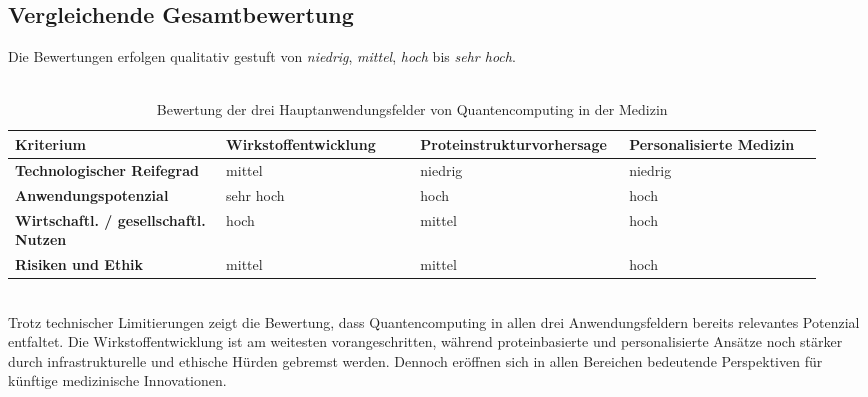 \subsection{Vergleichende Gesamtbewertung}
Die Bewertungen erfolgen qualitativ gestuft von \textit{niedrig}, \textit{mittel}, \textit{hoch} bis \textit{sehr hoch}.\\
\\
\begin{table}[h]
\centering
\begin{tabular}{|p{0.25\linewidth}|p{0.23\linewidth}|p{0.23\linewidth}|p{0.23\linewidth}|}
\hline
\textbf{Kriterium} & \textbf{Wirkstoff\-entwicklung} & \textbf{Proteinstruktur\-vorhersage} & \textbf{Personalisierte Medizin} \\
\hline
\textbf{Technologischer Reifegrad} & mittel & niedrig & niedrig \\
\hline
\textbf{Anwendungs\-potenzial} & sehr hoch & hoch & hoch \\
\hline
\textbf{Wirtschaftl. / gesellschaftl. Nutzen} & hoch & mittel & hoch \\
\hline
\textbf{Risiken und Ethik} & mittel & mittel & hoch \\
\hline
\end{tabular}
\caption{Bewertung der drei Hauptanwendungsfelder von Quantencomputing in der Medizin}
\label{tab:qc-medizin-bewertung}
\end{table}
\\
Trotz technischer Limitierungen zeigt die Bewertung, dass Quantencomputing in allen drei Anwendungsfeldern bereits relevantes Potenzial entfaltet. Die Wirkstoffentwicklung ist am weitesten vorangeschritten, während proteinbasierte und personalisierte Ansätze noch stärker durch infrastrukturelle und ethische Hürden gebremst werden. Dennoch eröffnen sich in allen Bereichen bedeutende Perspektiven für künftige medizinische Innovationen.



\printbibliography

